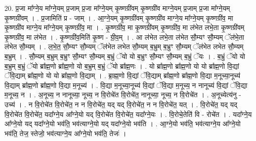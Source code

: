 \documentclass[17pt]{extarticle}
\begin{document}
20. प्र॒जा मा᳚ग्ने॒य मा᳚ग्ने॒यम् प्र॒जाम् प्र॒जा मा᳚ग्ने॒यम् कृ॒ष्णग्री॑वम् कृ॒ष्णग्री॑व माग्ने॒यम् प्र॒जाम् प्र॒जा मा᳚ग्ने॒यम् कृ॒ष्णग्री॑वम् । . प्र॒जामिति॑ प्र - जाम् । . आ॒ग्ने॒यम् कृ॒ष्णग्री॑वम् कृ॒ष्णग्री॑व माग्ने॒य मा᳚ग्ने॒यम् कृ॒ष्णग्री॑व॒ मा कृ॒ष्णग्री॑व माग्ने॒य मा᳚ग्ने॒यम् कृ॒ष्णग्री॑व॒ मा । . कृ॒ष्णग्री॑व॒ मा कृ॒ष्णग्री॑वम् कृ॒ष्णग्री॑व॒ मा ल॑भेत लभे॒ता कृ॒ष्णग्री॑वम् कृ॒ष्णग्री॑व॒ मा ल॑भेत । . कृ॒ष्णग्री॑व॒मिति॑ कृ॒ष्ण - ग्री॒व॒म् । . आ ल॑भेत लभे॒ता ल॑भेत सौ॒म्यꣳ सौ॒म्यम् ॅल॑भे॒ता ल॑भेत सौ॒म्यम् । . ल॒भे॒त॒ सौ॒म्यꣳ सौ॒म्यम् ॅल॑भेत लभेत सौ॒म्यम् ब॒भ्रुम् ब॒भ्रुꣳ सौ॒म्यम् ॅल॑भेत लभेत सौ॒म्यम् ब॒भ्रुम् । . सौ॒म्यम् ब॒भ्रुम् ब॒भ्रुꣳ सौ॒म्यꣳ सौ॒म्यम् ब॒भ्रुं ॅयो यो ब॒भ्रुꣳ सौ॒म्यꣳ सौ॒म्यम् ब॒भ्रुं ॅयः । . ब॒भ्रुं ॅयो यो ब॒भ्रुम् ब॒भ्रुं ॅयो ब्रा᳚ह्म॒णो ब्रा᳚ह्म॒णो यो ब॒भ्रुम् ब॒भ्रुं ॅयो ब्रा᳚ह्म॒णः । . यो ब्रा᳚ह्म॒णो ब्रा᳚ह्म॒णो यो यो ब्रा᳚ह्म॒णो वि॒द्यां ॅवि॒द्याम् ब्रा᳚ह्म॒णो यो यो ब्रा᳚ह्म॒णो वि॒द्याम् । . ब्रा॒ह्म॒णो वि॒द्यां ॅवि॒द्याम् ब्रा᳚ह्म॒णो ब्रा᳚ह्म॒णो वि॒द्या म॒नूच्या॒नूच्य॑ वि॒द्याम् ब्रा᳚ह्म॒णो ब्रा᳚ह्म॒णो वि॒द्या म॒नूच्य॑ । . वि॒द्या म॒नूच्या॒नूच्य॑ वि॒द्यां ॅवि॒द्या म॒नूच्य॒ न नानूच्य॑ वि॒द्यां ॅवि॒द्या म॒नूच्य॒ न । . अ॒नूच्य॒ न नानूच्या॒ नूच्य॒ न वि॒रोचे॑त वि॒रोचे॑त॒ नानूच्या॒ नूच्य॒ न वि॒रोचे॑त । . अ॒नूच्येत्य॑नु - उच्य॑ । . न वि॒रोचे॑त वि॒रोचे॑त॒ न न वि॒रोचे॑त॒ यद् यद् वि॒रोचे॑त॒ न न वि॒रोचे॑त॒ यत् । . वि॒रोचे॑त॒ यद् यद् वि॒रोचे॑त वि॒रोचे॑त॒ यदा᳚ग्ने॒य आ᳚ग्ने॒यो यद् वि॒रोचे॑त वि॒रोचे॑त॒ यदा᳚ग्ने॒यः । . वि॒रोचे॒तेति॑ वि - रोचे॑त । . यदा᳚ग्ने॒य आ᳚ग्ने॒यो यद् यदा᳚ग्ने॒यो भव॑ति॒ भव॑त्याग्ने॒यो यद् यदा᳚ग्ने॒यो भव॑ति । . आ॒ग्ने॒यो भव॑ति॒ भव॑त्याग्ने॒य आ᳚ग्ने॒यो भव॑ति॒ तेज॒ स्तेजो॒ भव॑त्याग्ने॒य आ᳚ग्ने॒यो भव॑ति॒ तेजः॑ । \newline
\end{document}
